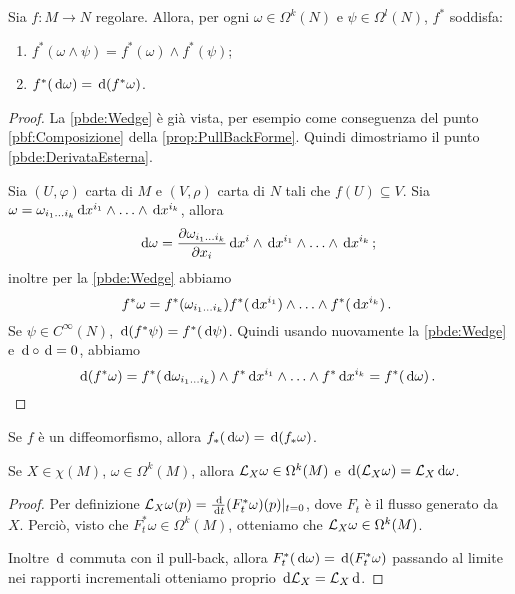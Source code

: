 \begin{theorem} \label{thm:PullBackDerivataEsterna}
	Sia $f:M\to N$ regolare. Allora, per ogni $\omega \in \Omega^k(N)$ e $\psi \in \Omega^l(N)$, $f^*$ soddisfa:
	\begin{enumerate}
		\item $f^*(\omega \wedge \psi) = f^*(\omega) \wedge f^*(\psi)$; \label{pbde:Wedge}
		\item $f^*(\,\mathrm d \omega) = \,\mathrm d (f^*\omega)$. \label{pbde:DerivataEsterna}
	\end{enumerate}
\end{theorem}
\begin{proof}
	La \ref{pbde:Wedge} è già vista, per esempio come conseguenza del punto \ref{pbf:Composizione} della \cref{prop:PullBackForme}. Quindi dimostriamo il punto \ref{pbde:DerivataEsterna}.
	
	Sia $(U,\varphi)$ carta di $M$ e $(V,\rho)$ carta di $N$ tali che $f(U)\subseteq V$. Sia $\omega = \omega_{i_1 \ldots  i_{k}} \,\mathrm d x^{i_1}\wedge\ldots\wedge \,\mathrm d x^{i_k}$, allora
	\begin{equation*}
		\,\mathrm d \omega = \frac{\partial \omega_{i_1 \ldots  i_{k}}}{\partial x_i} \,\mathrm d x^i \wedge \,\mathrm d x^{i_1} \wedge \ldots \wedge \,\mathrm d x^{i_k} \, \text{; }
	\end{equation*}
	inoltre per la \ref{pbde:Wedge} abbiamo
	\begin{equation*}
		f^*\omega = f^*(\omega_{i_1 \ldots  i_{k}}) f^*(\,\mathrm d x^{i_1}) \wedge \ldots \wedge f^* (\,\mathrm d x^{i_k})\, \text{. }
	\end{equation*}
	Se $\psi \in C^\infty(N)$, $\,\mathrm d (f^*\psi) = f^* (\,\mathrm d \psi)$. Quindi usando nuovamente la \ref{pbde:Wedge} e $\,\mathrm d\circ\,\mathrm d =0$, abbiamo
	\begin{equation*}
		\,\mathrm d (f^*\omega) = f^*(\,\mathrm d \omega_{i_1 \ldots  i_{k}})\wedge f^*\,\mathrm d x^{i_1} \wedge \ldots \wedge f^*\,\mathrm d x^{i_k} = f^*(\,\mathrm d\omega)\, \text{. }
	\end{equation*}
\end{proof}

\begin{corollary}
	Se $f$ è un diffeomorfismo, allora $f_*(\,\mathrm d\omega) = \,\mathrm d (f_* \omega)$.
\end{corollary}

\begin{corollary} \label{cor:CommutazioneLieDerivataEsterna}
	Se $X\in\chi(M)$, $\omega \in \Omega^k(M)$, allora $\mathcal L_X\omega \in \Omega^k(M)$ e $\,\mathrm d (\mathcal L_X\omega) = \mathcal L_X \,\mathrm d \omega$.
\end{corollary}

\begin{proof}
Per definizione $\mathcal L_X\omega(p) = \frac{\,\mathrm d}{\,\mathrm d t} (F_t^*\omega)(p)|_{t=0}$, dove $F_t$ è il flusso generato da $X$. %
Perciò, visto che $F_t^*\omega\in \Omega^k(M)$, otteniamo che $\mathcal L_X\omega \in \Omega^k(M)$.

Inoltre $\,\mathrm d$ commuta con il pull-back, allora $F_t^* (\,\mathrm d\omega) = \,\mathrm d (F_t^* \omega)$ passando al limite nei rapporti incrementali otteniamo proprio $\,\mathrm d \mathcal L_X = \mathcal L_X \,\mathrm d$.
\end{proof}



